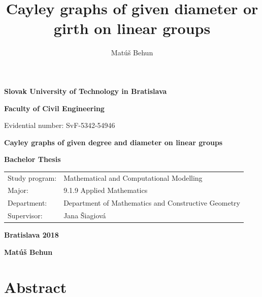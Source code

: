 \documentclass[a4paper,12pt,oneside]{report}%
\author{Mat\'u\v{s} Behun}
\title{Cayley graphs of given diameter or girth on linear groups}
\begin{document}
\setlength{\belowdisplayskip}{7pt} \setlength{\belowdisplayshortskip}{5pt}
\setlength{\abovedisplayskip}{7pt} \setlength{\abovedisplayshortskip}{5pt}


\thispagestyle{empty}
{
     \topmargin=0pt
     \centerline {\large \bf{Slovak University of Technology in Bratislava}}
     \vskip 0.2cm
     \centerline{\large \bf{Faculty of Civil Engineering}}
     \vskip 0.2cm
	 Evidential number: SvF-5342-54946
     \vskip 5.0cm
     \centerline{\Large \bf{Cayley graphs of given degree and diameter on linear groups}}
     \vskip 0.2cm
     \vskip 0.5cm
     \centerline{\large \bf{Bachelor Thesis}}
     \vskip 7cm          %
     \normalsize
         \begin{tabular}[l]{p{}p{}}
			 Study program: & Mathematical and Computational Modelling  \\
			 Major: & 9.1.9 Applied Mathematics  \\
         	 Department: & Department of Mathematics and Constructive Geometry\\
			 Supervisor: & Jana \v{S}iagiov\'a \\
         \end{tabular}
     \vskip 3cm
     \centerline{\large \bf{Bratislava 2018}}
     \vskip 0.2cm
	 \centerline{\large \bf{Mat\'u\v{s} Behun}}
}

 \newpage


\section{Abstract}
\end{document}
